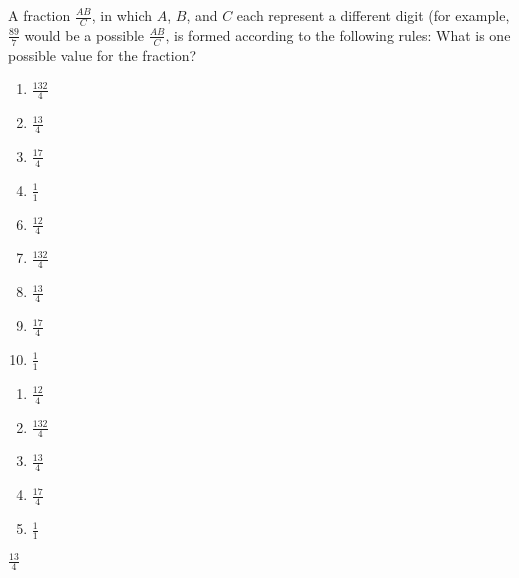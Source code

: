 A fraction $\frac{AB}{C}$, in which $A$, $B$, and $C$ each
represent a different digit (for example,
$\frac{89}{7}$ would be a possible $\frac{AB}{C}$, is formed
according to the following rules:
What is one possible value for the fraction?



\ifsat
	\begin{enumerate}[label=\Alph*)]
		\item $\frac{132}{4}$
		\item $\frac{13}{4}$%
		\item $\frac{17}{4}$
		\item $\frac{1}{1}$
	\end{enumerate}
\else
\fi

\ifacteven
	\begin{enumerate}[label=\textbf{\Alph*.},itemsep=\fill,align=left]
		\setcounter{enumii}{5}
		\item $\frac{12}{4}$
		\item $\frac{132}{4}$
		\item $\frac{13}{4}$%
		\addtocounter{enumii}{1}
		\item $\frac{17}{4}$
		\item $\frac{1}{1}$
	\end{enumerate}
\else
\fi

\ifactodd
	\begin{enumerate}[label=\textbf{\Alph*.},itemsep=\fill,align=left]
		\item $\frac{12}{4}$
		\item $\frac{132}{4}$
		\item $\frac{13}{4}$%
		\item $\frac{17}{4}$
		\item $\frac{1}{1}$
	\end{enumerate}
\else
\fi

\ifgridin
 $\frac{13}{4}$%
		
\else
\fi

